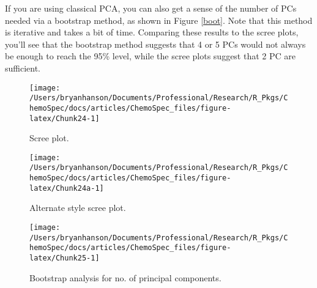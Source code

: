 \documentclass[letter,10pt,twocolumn,twoside,printwatermark=false]{pinp}
\begin{document}
If you are using classical PCA, you can also get a sense of the number
of PCs needed via a bootstrap method, as shown in Figure \ref{boot}.
Note that this method is iterative and takes a bit of time. Comparing
these results to the scree plots, you'll see that the bootstrap method
suggests that 4 or 5 PCs would not always be enough to reach the 95\%
level, while the scree plots suggest that 2 PC are sufficient.

\begin{Shaded}
\begin{Highlighting}[]
\end{Highlighting}
\end{Shaded}

\begin{figure}

{\centering \texttt{[image: /Users/bryanhanson/Documents/Professional/Research/R\_Pkgs/ChemoSpec/docs/articles/ChemoSpec\_files/figure-latex/Chunk24-1]} 

}

\caption{\label{scree}Scree plot.}\label{fig:Chunk24}
\end{figure}

\begin{Shaded}
\begin{Highlighting}[]
 \NormalTok{, }
\end{Highlighting}
\end{Shaded}

\begin{figure}

{\centering \texttt{[image: /Users/bryanhanson/Documents/Professional/Research/R\_Pkgs/ChemoSpec/docs/articles/ChemoSpec\_files/figure-latex/Chunk24a-1]} 

}

\caption{\label{scree2}Alternate style scree plot.}\label{fig:Chunk24a}
\end{figure}

\begin{Shaded}
\begin{Highlighting}[]
\StringTok{ }
   \NormalTok{)}
\end{Highlighting}
\end{Shaded}

\begin{figure}

{\centering \texttt{[image: /Users/bryanhanson/Documents/Professional/Research/R\_Pkgs/ChemoSpec/docs/articles/ChemoSpec\_files/figure-latex/Chunk25-1]} 

}

\caption{\label{boot}Bootstrap analysis for no. of principal components.}\label{fig:Chunk25}
\end{figure}
\end{document}
